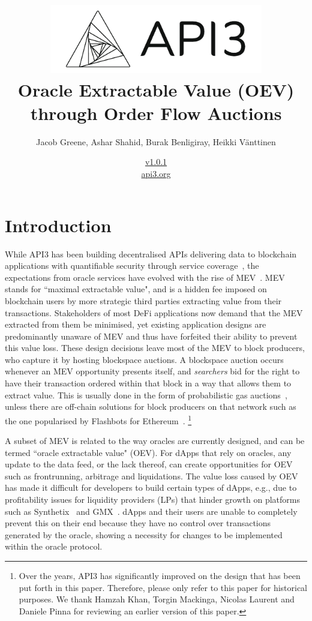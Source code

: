 \documentclass[11pt]{article}
\title{\includegraphics[width=0.7\textwidth]{fig/api3/api3} \\ Oracle Extractable Value (OEV)\\ through Order Flow Auctions
}
\author{Jacob Greene, Ashar Shahid, Burak Benligiray, Heikki Vänttinen}
\date{\hyperref[sec:versions]{v1.0.1} \\ \medskip \href{https://api3.org}{api3.org}}
\begin{document}
\maketitle

\section{Introduction}

While API3 has been building decentralised APIs delivering data to blockchain applications with quantifiable security through service coverage~\cite{api3}, the expectations from oracle services have evolved with the rise of MEV~\cite{flashbots-explore}.
MEV stands for ``maximal extractable value", and is a hidden fee imposed on blockchain users by more strategic third parties extracting value from their transactions.
Stakeholders of most DeFi applications now demand that the MEV extracted from them be minimised, yet existing application designs are predominantly unaware of MEV and thus have forfeited their ability to prevent this value loss.
These design decisions leave most of the MEV to block producers, who capture it by hosting blockspace auctions.
A blockspace auction occurs whenever an MEV opportunity presents itself, and \textit{searchers} bid for the right to have their transaction ordered within that block in a way that allows them to extract value.
This is usually done in the form of probabilistic gas auctions~\cite{Daian:2019}, unless there are off-chain solutions for block producers on that network such as the one popularised by Flashbots for Ethereum~\cite{flashbots-boost}.
{\let\thefootnote\relax\footnote{{Over the years, API3 has significantly improved on the design that has been put forth in this paper.
Therefore, please only refer to this paper for historical purposes.
We thank Hamzah Khan, Torgin Mackinga, Nicolas Laurent and Daniele Pinna for reviewing an earlier version of this paper.
}}}

A subset of MEV is related to the way oracles are currently designed, and can be termed ``oracle extractable value" (OEV).
For dApps that rely on oracles, any update to the data feed, or the lack thereof, can create opportunities for OEV such as frontrunning, arbitrage and liquidations.
The value loss caused by OEV has made it difficult for developers to build certain types of dApps, e.g., due to profitability issues for liquidity providers (LPs) that hinder growth on platforms such as Synthetix~\cite{sip-37} and GMX~\cite{kip-17}.
dApps and their users are unable to completely prevent this on their end because they have no control over transactions generated by the oracle, showing a necessity for changes to be implemented within the oracle protocol.
\end{document}
